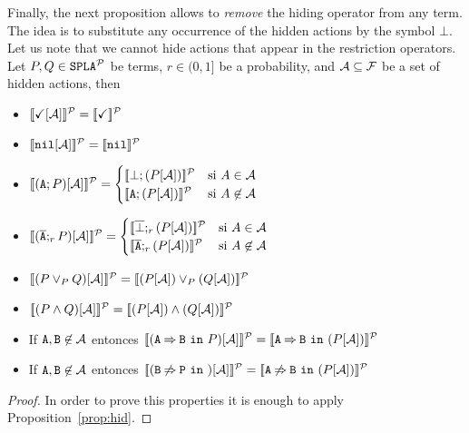 Finally, the next proposition allows to \emph{remove} the hiding
operator from any term. The idea is to substitute any occurrence of
the hidden actions by the symbol $\bot$. Let us note that we cannot
hide actions that appear in the restriction operators.
\bprop
  Let $P,Q\in\mathtt{SPLA{^{\cal P}}}$ be terms, $r\in (0,1]$ be a probability, and
  ${\cal A}\subseteq{\cal F}$ be a set of hidden actions, then
  \begin{itemize}
  \item $[\![\checkmark[{\cal A}]]\!]^{\cal P}=[\![\checkmark]\!]^{\cal P}$
  \item $[\![\mathtt{nil}[{\cal A}]]\!]^{\cal P}=[\![\mathtt{nil}]\!]^{\cal P}$
  \item
      $\semdenp{(\fA;P)\hide\calA}=
      \begin{cases}
        \semdenp{\bot;(P\hide\calA)} & \mbox{si } A\in\calA\\
        \semdenp{\fA;(P\hide\calA)} & \mbox{si } A\not\in\calA\\
      \end{cases}$
  \item
      $\semdenp{(\ofA;_rP)\hide\calA}=
      \begin{cases}
        \semdenp{\overline{\bot};_r(P\hide\calA)} & \mbox{si } A\in\calA\\
        \semdenp{\ofA;_r(P\hide\calA)} & \mbox{si } A\not\in\calA\\
      \end{cases}$
  \item $[\![(P\mathbin{\lor}_P Q)[{\cal A}]]\!]^{\cal P}=[\![(P[{\cal A}])\mathbin{\lor}_P (Q[{\cal A}])]\!]^{\cal P}$
  \item $[\![(P\mathbin{\wedge} Q)[{\cal A}]]\!]^{\cal P}=[\![(P[{\cal A}])\mathbin{\wedge} (Q[{\cal A}])]\!]^{\cal P}$
  \item If ${\mathtt{A}},{\mathtt{B}}\not\in{\cal A}$ entonces
    $[\![(\mathtt{A}\mathbin{\Rightarrow}\mathtt{B}\ \mathtt{in}\ P)[{\cal A}]]\!]^{\cal P}=[\![\mathtt{A}\mathbin{\Rightarrow}\mathtt{B}\ \mathtt{in}\ (P[{\cal A}])]\!]^{\cal P}$
  \item If ${\mathtt{A}},{\mathtt{B}}\not\in{\cal A}$ entonces
    $[\![(\mathtt{B}\mathbin{\not\Rightarrow}\mathtt{P}\ \mathtt{in}\ )[{\cal A}]]\!]^{\cal P}=[\![\mathtt{A}\mathbin{\not\Rightarrow}\mathtt{B}\ \mathtt{in}\ (P[{\cal A}])]\!]^{\cal P}$
  \end{itemize}
  \begin{proof}
    In order to prove this properties it is enough to apply
    Proposition~\ref{prop:hid}.
  \end{proof}
\eprop


